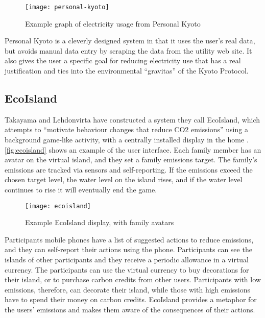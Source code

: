 \begin{figure}[htbp]
	\centering
		\texttt{[image: personal-kyoto]}
		\caption{Example graph of electricity usage from Personal Kyoto}
		\label{fig:personal-kyoto}
\end{figure}

Personal Kyoto is a cleverly designed system in that it uses the user's real data, but avoids manual data entry by scraping the data from the utility web site. It also gives the user a specific goal for reducing electricity use that has a real justification and ties into the environmental ``gravitas'' of the Kyoto Protocol.

\subsection{EcoIsland}
\label{sec:ecoisland}

Takayama and Lehdonvirta have constructed a system they call EcoIsland, which attempts to ``motivate behaviour changes that reduce CO2 emissions'' using a background game-like activity, with a centrally installed display in the home \cite{takayama-2008}. \autoref{fig:ecoisland} shows an example of the user interface. Each family member has an avatar on the virtual island, and they set a family \COtwo emissions target. The family's emissions are tracked via sensors and self-reporting. If the emissions exceed the chosen target level, the water level on the island rises, and if the water level continues to rise it will eventually end the game.

\begin{figure}[htb]
	\centering
		\texttt{[image: ecoisland]}
		\caption{Example EcoIsland display, with family avatars}
		\label{fig:ecoisland}
\end{figure}

Participants mobile phones have a list of suggested actions to reduce emissions, and they can self-report their actions using the phone. Participants can see the islands of other participants and they receive a periodic allowance in a virtual currency. The participants can use the virtual currency to buy decorations for their island, or to purchase carbon credits from other users. Participants with low emissions, therefore, can decorate their island, while those with high emissions have to spend their money on carbon credits. EcoIsland provides a metaphor for the users' emissions and makes them aware of the consequences of their actions.

